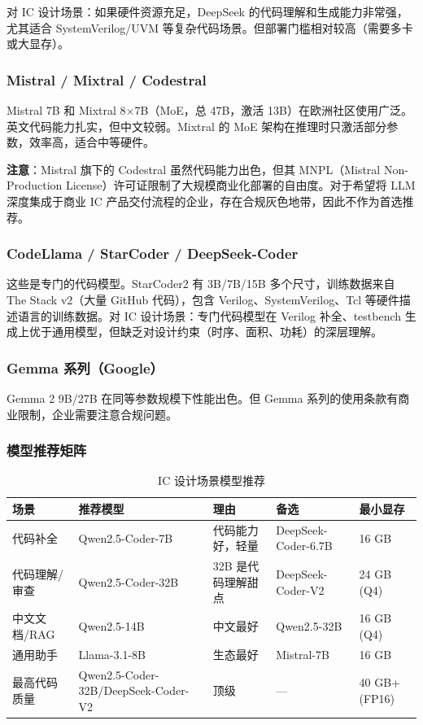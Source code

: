 \documentclass[UTF8,a4paper,10pt,oneside]{ctexart}
\begin{document}
对 IC 设计场景：如果硬件资源充足，DeepSeek 的代码理解和生成能力非常强，尤其适合 SystemVerilog/UVM 等复杂代码场景。但部署门槛相对较高（需要多卡或大显存）。

\subsubsection{Mistral / Mixtral / Codestral}

Mistral 7B 和 Mixtral 8$\times$7B（MoE，总 47B，激活 13B）在欧洲社区使用广泛。英文代码能力扎实，但中文较弱。Mixtral 的 MoE 架构在推理时只激活部分参数，效率高，适合中等硬件。

\textbf{注意}：Mistral 旗下的 Codestral 虽然代码能力出色，但其 MNPL（Mistral Non-Production License）许可证限制了大规模商业化部署的自由度。对于希望将 LLM 深度集成于商业 IC 产品交付流程的企业，存在合规灰色地带，因此不作为首选推荐。

\subsubsection{CodeLlama / StarCoder / DeepSeek-Coder}

这些是专门的代码模型。StarCoder2 有 3B/7B/15B 多个尺寸，训练数据来自 The Stack v2（大量 GitHub 代码），包含 Verilog、SystemVerilog、Tcl 等硬件描述语言的训练数据。对 IC 设计场景：专门代码模型在 Verilog 补全、testbench 生成上优于通用模型，但缺乏对设计约束（时序、面积、功耗）的深层理解。

\subsubsection{Gemma 系列（Google）}

Gemma 2 9B/27B 在同等参数规模下性能出色。但 Gemma 系列的使用条款有商业限制，企业需要注意合规问题。

\subsubsection{模型推荐矩阵}

\begin{table}[htbp]
\centering
\caption{IC 设计场景模型推荐}
\begin{tabular}{p{2.5cm}p{3.10cm}p{3.2cm}p{3.5cm}p{1.8cm}}
\hline
\textbf{场景} & \textbf{推荐模型} & \textbf{理由} & \textbf{备选} & \textbf{最小显存} \\
\hline
代码补全 & Qwen2.5-Coder-7B & 代码能力好，轻量 & DeepSeek-Coder-6.7B & 16 GB \\
代码理解/审查 & Qwen2.5-Coder-32B & 32B 是代码理解甜点 & DeepSeek-Coder-V2 & 24 GB (Q4) \\
中文文档/RAG & Qwen2.5-14B & 中文最好 & Qwen2.5-32B & 16 GB (Q4) \\
通用助手 & Llama-3.1-8B & 生态最好 & Mistral-7B & 16 GB \\
最高代码质量 & Qwen2.5-Coder-32B/DeepSeek-Coder-V2 & 顶级 & — & 40 GB+ (FP16) \\
\hline
\end{tabular}
\end{table}
\end{document}
